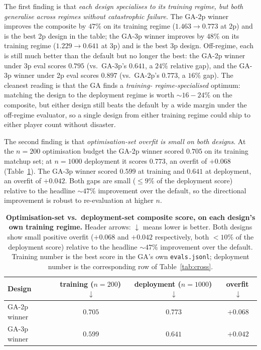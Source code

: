 \documentclass[10pt]{article}
\begin{document}
The first finding is that \emph{each design specialises to its
training regime, but both generalise across regimes without
catastrophic failure}. The GA-2p winner improves the composite by
$47\%$ on its training regime ($1.463 \!\to\! 0.773$ at 2p) and is
the best 2p design in the table; the GA-3p winner improves by $48\%$
on its training regime ($1.229 \!\to\! 0.641$ at 3p) and is the best
3p design. Off-regime, each is still much better than the default
but no longer the best: the GA-2p winner under 3p eval scores
$0.795$ (vs.\ GA-3p's $0.641$, a $24\%$ relative gap), and the GA-3p
winner under 2p eval scores $0.897$ (vs.\ GA-2p's $0.773$, a $16\%$
gap). The cleanest reading is that the GA finds a \emph{training-
regime-specialised} optimum: matching the design to the deployment
regime is worth $\sim 16\!-\!24\%$ on the composite, but either
design still beats the default by a wide margin under the
off-regime evaluator, so a single design from either training
regime could ship to either player count without disaster.

The second finding is that \emph{optimisation-set overfit is small
on both designs}. At the $n{=}200$ optimisation budget the GA-2p
winner scored $0.705$ on its training matchup set; at $n{=}1000$
deployment it scores $0.773$, an overfit of $+0.068$
(Table~\ref{tab:overfit}). The GA-3p winner scored $0.599$ at
training and $0.641$ at deployment, an overfit of $+0.042$. Both
gaps are small ($\leq 9\%$ of the deployment score) relative to the
headline $\sim 47\%$ improvement over the default, so the
directional improvement is robust to re-evaluation at higher $n$.

\begin{table}[h!]
\centering
\small
\begin{tabular}{lccc}
\toprule
Design & training ($n{=}200$)\,$\downarrow$ & deployment ($n{=}1000$)\,$\downarrow$ & overfit\,$\downarrow$ \\
\midrule
GA-2p winner & $0.705$ & $0.773$ & $+0.068$ \\
GA-3p winner & $0.599$ & $0.641$ & $+0.042$ \\
\bottomrule
\end{tabular}
\caption{\textbf{Optimisation-set vs.\ deployment-set composite
score, on each design's own training regime.} Header arrows:
$\downarrow$ means lower is better. Both designs show small
positive overfit ($+0.068$ and $+0.042$ respectively, both $<\!10\%$
of the deployment score) relative to the headline $\sim 47\%$
improvement over the default. Training number is the best score in
the GA's own \texttt{evals.jsonl}; deployment number is the
corresponding row of Table~\ref{tab:cross}.}
\label{tab:overfit}
\end{table}
\end{document}
